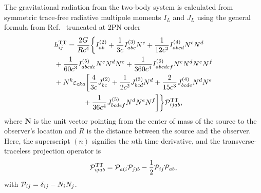 \documentclass[aps, prd,
twocolumn,%
superscriptaddress,
showpacs, nofootinbib, eqsecnum, amsmath, amssymb, floatfix
]{revtex4}
\begin{document}
The gravitational radiation from the two-body system is calculated from
symmetric trace-free radiative multipole moments $I_{L}$ and $J_{L}$ using the
general formula from Ref.~\cite{thorne80} truncated at 2PN order
\begin{align} \label{eq:hij}
&h_{ij}^{\mathrm{ TT}}=\frac{2G}{Rc^4}\bigg\{I_{ab}^{(2)}+
\frac{1}{3c} I_{ abc}^{(3)}N^c+\frac{1}{12 c^2}I_{abcd}^{(4)}
N^{c}N^{d}\nonumber\\ &+
\frac{1}{60 c^3}I^{(5)}_{ abcde}N^{c}N^{d}N^{e}+\frac{1}{360c^4}
I^{(6)}_{abcdef}N^{c}N^{d}N^{e}N^{f} \nonumber\\
& + N^{k}\varepsilon_{cka}\bigg[\frac{4}{3c}J_{ bc}^{(2)}+
\frac{1}{2c^2}J_{ bcd }^{(3)}N^d +\frac{2}{15 c^3}
J_{ bcde}^{(4)}N^{d}N^{e}\nonumber\\
& \qquad \qquad +
\frac{1}{36c^4}J_{ bcdef}^{(5)}N^{d}N^{e}N^{f}\bigg]\bigg\}{\cal P}_{ijab}^{\mathrm{TT}},
\end{align}
where $\bm{N}$ is the unit vector pointing from the center of mass
of the source to the observer's location and $R$ is the distance
between the source and the observer. Here, the superscript ${(n)}$
signifies the $n$th time derivative, and the transverse-traceless
projection operator is
\begin{equation}
{\cal P}_{ijab}^{\mathrm{TT}}={\cal P}_{a(i}{\cal P}_{j)b}-
\frac{1}{2}{\cal P}_{ij}{\cal P}_{ab},
\end{equation}
with ${\cal P}_{ij}=\delta_{ij}-N_{i}N_{j}$.
\end{document}
